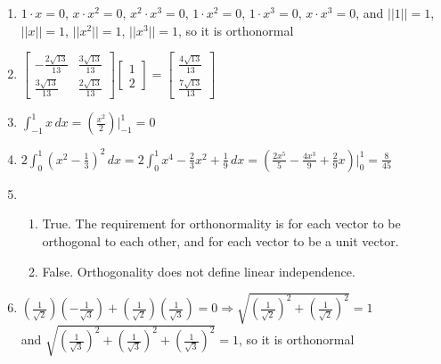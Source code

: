 \documentclass[12pt]{article}
\begin{document}
\begin{enumerate}
  \item $1\cdot x=0$, $x\cdot x^2=0$, $x^2\cdot x^3=0$, $1\cdot x^2=0$, $1\cdot x^3=0$, $x\cdot x^3=0$, and $||1||=1$, $||x||=1$, $||x^2||=1$, $||x^3||=1$, so it is orthonormal

    \setcounter{enumi}{18}

  \item $\begin{bmatrix} -\frac{2\sqrt{13}}{13} & \frac{3\sqrt{13}}{13}\\ \frac{3\sqrt{13}}{13} & \frac{2\sqrt{13}}{13}  \end{bmatrix}\begin{bmatrix} 1\\2  \end{bmatrix}=\begin{bmatrix} \frac{4\sqrt{13}}{13}\\ \frac{7\sqrt{13}}{13}\end{bmatrix}$

    \setcounter{enumi}{42}

  \item $\int_{-1}^1 x\,dx=\left( \frac{x^2}{2} \right)\Big|_{-1}^1=0$ \textcolor{green}{\checkmark}

    \setcounter{enumi}{47}

  \item $2\int_0^1 \left( x^2-\frac{1}{3} \right)^2\,dx=2\int_0^1 x^4-\frac{2}{3}x^2+\frac{1}{9}\,dx=\left( \frac{2x^5}{5}-\frac{4x^3}{9}+\frac{2}{9}x \right)\Big|_0^1=\frac{8}{45}$ \textcolor{green}{\checkmark}

    \setcounter{enumi}{55}

  \item

    \begin{enumerate}

      \item True. The requirement for orthonormality is for each vector to be orthogonal to each other, and for each vector to be a unit vector.

      \item False. Orthogonality does not define linear independence. 

    \end{enumerate}

    \setcounter{enumi}{60}

  \item $\left( \frac{1}{\sqrt{2}} \right)\left( -\frac{1}{\sqrt{3}}  \right)+\left( \frac{1}{\sqrt{2}} \right)\left( \frac{1}{\sqrt{3}} \right)=0\Rightarrow \sqrt{\left( \frac{1}{\sqrt{2}} \right)^2+\left( \frac{1}{\sqrt{2}} \right)^2}=1$\\ and $\sqrt{\left( \frac{1}{\sqrt{3}} \right)^2 + \left( \frac{1}{\sqrt{3}} \right)^2 + \left( \frac{1}{\sqrt{3}} \right)^2}=1$, so it is orthonormal


\end{enumerate}
\end{document}
